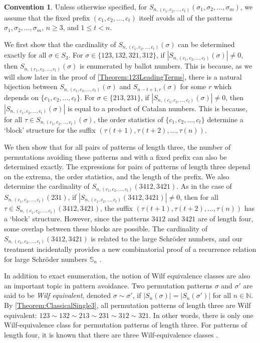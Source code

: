 \documentclass[11pt]{article}
\theoremstyle{definition}
\newtheorem{convention}[theorem]{Convention}
\numberwithin{equation}{section}
\begin{document}
\begin{convention}\label{Convention:AvoidanceForLeadingTerms}
Unless otherwise specified, for $S_{n,(c_1,c_2,\ldots,c_t)}(\sigma_1,\sigma_2,\ldots,\sigma_m)$, 
we assume that the fixed prefix 
$(c_1,c_2,\ldots,c_t)$ itself avoids all of the patterns $\sigma_1,\sigma_2,\ldots,\sigma_m$, $n\geq3$, and $1\leq t<n$.
\end{convention}

We first show that the cardinality of 
$S_{n,(c_1,c_2,\ldots,c_t)}(\sigma)$ can be determined exactly for all $\sigma\in S_3$. For $\sigma\in\{123,132,321,312\}$, if $|S_{n,(c_1,c_2,\ldots,c_t)}(\sigma)|\neq0$, then $S_{n,(c_1,c_2,\ldots,c_t)}(\sigma)$ is enumerated by ballot numbers. This is because, as we will show later in the proof of \cref{Theorem:123LeadingTerms}, there is a natural bijection between $S_{n,(c_1,c_2,\ldots,c_t)}(\sigma)$ and $S_{n-t+1,r}(\sigma)$ for some $r$ 
which depends on $\{c_1,c_2,\ldots,c_t\}$. For $\sigma\in\{213,231\}$, if $|S_{n,(c_1,c_2,\ldots,c_t)}(\sigma)|\neq0$, then $|S_{n,(c_1,c_2,\ldots,c_t)}(\sigma)|$ is equal to a product of Catalan numbers. This is because, for all $\tau\in S_{n,(c_1,c_2,\ldots,c_t)}(\sigma)$, the 
order statistics of $\{c_1,c_2,\ldots,c_t\}$ determine 
a `block' structure for the suffix $(\tau(t+1),\tau(t+2),\ldots,\tau(n))$.

We then show that for all pairs of patterns of length three, 
the number of permutations avoiding these patterns and with 
a fixed prefix can also be determined exactly. The expressions for pairs of patterns 
of length three depend on the extrema, the order statistics, and the 
length of the prefix.
We also determine the cardinality of $S_{n,(c_1,c_2,\ldots,c_t)}(3412,3421)$. As in the 
case of $S_{n,(c_1,c_2,\ldots,c_t)}(231)$, if $|S_{n,(c_1,c_2,\ldots,c_t)}(3412,3421)|\neq 0$, 
then for all $\tau\in S_{n,(c_1,c_2,\ldots,c_t)}(3412,3421)$, the suffix $(\tau(t+1),\tau(t+2),\ldots,\tau(n))$ 
has a 
`block' structure. However, since the patterns $3412$ and $3421$ are of length four, 
some overlap between these blocks are possible. The cardinality 
of $S_{n,(c_1,c_2,\ldots,c_t)}(3412,3421)$ is related to the large Schr\"{o}der numbers, 
and our treatment
incidentally provides a new combinatorial proof of 
a recurrence relation for large Schr\"{o}der numbers $\mathbb{S}_n$ \cite[p.~446]{Bona2022}. 

In addition to exact enumeration, the notion of Wilf equivalence classes are also an important topic in pattern 
avoidance. Two permutation patterns $\sigma$ and $\sigma'$ are said to 
be {\em Wilf equivalent}, denoted $\sigma\sim\sigma'$, if $|S_n(\sigma)|=|S_n(\sigma')|$ for all $n\in\mathbb{N}$. By \cref{Theorem:ClassicalSingle3}, all permutation patterns of length three are Wilf equivalent: $123\sim132\sim213\sim231\sim312\sim321$. In other words, there is only one Wilf-equivalence class for permutation patterns of length three. For patterns of length four, it is known that there are three Wilf-equivalence classes \cite[p.~158]{Bona2022}.
\end{document}
